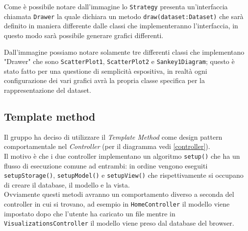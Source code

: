 Come è possibile notare dall'immagine lo \texttt{Strategy} presenta un'interfaccia chiamata \texttt{Drawer} la quale dichiara un metodo \texttt{draw(dataset:Dataset)} che sarà definito in maniera differente dalle classi che implementeranno l'interfaccia, in questo modo sarà possibile generare grafici differenti.

Dall'immagine possiamo notare solamente tre differenti classi che implementano "Drawer" che sono \texttt{ScatterPlot1}, \texttt{ScatterPlot2} e \texttt{Sankey1Diagram}; questo è stato fatto per una questione di semplicità espositiva, in realtà ogni configurazione dei vari grafici avrà la propria classe specifica per la rappresentazione del dataset. \\

\subsection{Template method}
Il gruppo ha deciso di utilizzare il \textit{Template Method} come design pattern comportamentale nel \textit{Controller} (per il diagramma vedi \ref{controller}). \\Il motivo è che i due controller implementano un algoritmo \texttt{setup()} che ha un flusso di esecuzione comune ad entrambi: in ordine vengono eseguiti \texttt{setupStorage()}, \texttt{setupModel()} e \texttt{setupView()} che rispettivamente si occupano di creare il database, il modello e la vista. \\Ovviamente questi metodi avranno un comportamento diverso a seconda del controller in cui si trovano, ad esempio in \texttt{HomeController} il modello viene impostato dopo che l'utente ha caricato un file mentre in \texttt{VisualizationsController} il modello viene preso dal database del browser.
